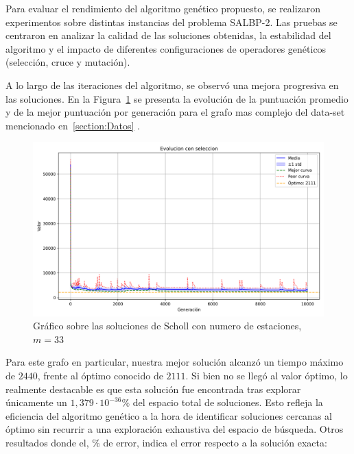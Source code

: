 \documentclass[12pt,a4paper]{report}
\begin{document}
Para evaluar el rendimiento del algoritmo genético propuesto, se realizaron experimentos sobre distintas instancias del problema SALBP-2. Las pruebas se centraron en analizar la calidad de las soluciones obtenidas, la estabilidad del algoritmo y el impacto de diferentes configuraciones de operadores genéticos (selección, cruce y mutación).

A lo largo de las iteraciones del algoritmo, se observó una mejora progresiva en las soluciones. En la Figura~\ref{fig:evolucion-punt} se presenta la evolución de la puntuación promedio y de la mejor puntuación por generación para el grafo mas complejo del data-set mencionado en~\ref{section:Datos} .

\begin{figure}[H]
        \centering
        \includegraphics[width=\linewidth]{DATA/scholl_M33.png}
        \caption{Gráfico sobre las soluciones de Scholl con numero de estaciones, $m=33$}
        \label{fig:evolucion-punt}
\end{figure}
Para este grafo en particular, nuestra mejor solución alcanzó un tiempo máximo de $2440$, frente al óptimo conocido de $2111$. Si bien no se llegó al valor óptimo, lo realmente destacable es que esta solución fue encontrada tras explorar únicamente un $1{,}379 \cdot 10^{-36}\%$ del espacio total de soluciones. Esto refleja la eficiencia del algoritmo genético a la hora de identificar soluciones cercanas al óptimo sin recurrir a una exploración exhaustiva del espacio de búsqueda. 
Otros resultados donde el, $\%$ de error, indica el error respecto a la solución exacta:
\end{document}

